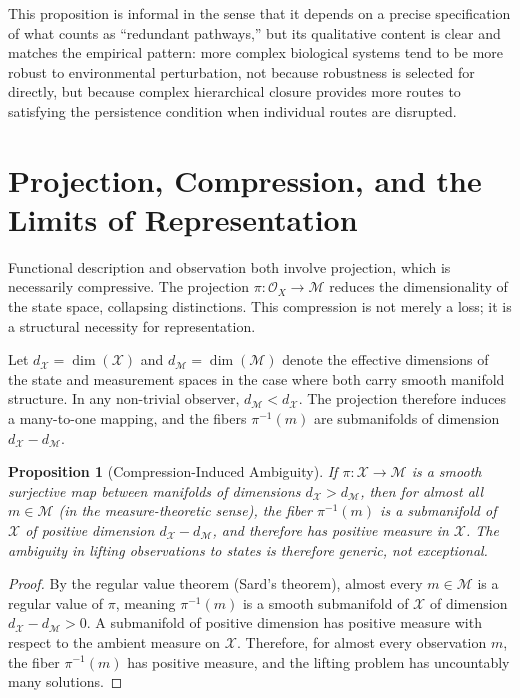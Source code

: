 \documentclass[12pt, a4paper, oneside]{article}
\theoremstyle{plain}
\newtheorem{proposition}[theorem]{Proposition}
\theoremstyle{definition}
\theoremstyle{remark}
\newcommand{\X}{\mathcal{X}}
\newcommand{\M}{\mathcal{M}}
\newcommand{\Obs}{\mathcal{O}}
\newcommand{\proj}{\pi}
\begin{document}
This proposition is informal in the sense that it depends on a precise specification of what counts as ``redundant pathways,'' but its qualitative content is clear and matches the empirical pattern: more complex biological systems tend to be more robust to environmental perturbation, not because robustness is selected for directly, but because complex hierarchical closure provides more routes to satisfying the persistence condition when individual routes are disrupted.

\section{Projection, Compression, and the Limits of Representation}

Functional description and observation both involve projection, which is necessarily compressive. The projection $\proj : \Obs_X \to \M$ reduces the dimensionality of the state space, collapsing distinctions. This compression is not merely a loss; it is a structural necessity for representation.

Let $d_\X = \dim(\X)$ and $d_\M = \dim(\M)$ denote the effective dimensions of the state and measurement spaces in the case where both carry smooth manifold structure. In any non-trivial observer, $d_\M < d_\X$. The projection therefore induces a many-to-one mapping, and the fibers $\proj^{-1}(m)$ are submanifolds of dimension $d_\X - d_\M$.

\begin{proposition}[Compression-Induced Ambiguity]
\label{prop:compression}
If $\proj : \X \to \M$ is a smooth surjective map between manifolds of dimensions $d_\X > d_\M$, then for almost all $m \in \M$ (in the measure-theoretic sense), the fiber $\proj^{-1}(m)$ is a submanifold of $\X$ of positive dimension $d_\X - d_\M$, and therefore has positive measure in $\X$. The ambiguity in lifting observations to states is therefore generic, not exceptional.
\end{proposition}

\begin{proof}
By the regular value theorem (Sard's theorem), almost every $m \in \M$ is a regular value of $\proj$, meaning $\proj^{-1}(m)$ is a smooth submanifold of $\X$ of dimension $d_\X - d_\M > 0$. A submanifold of positive dimension has positive measure with respect to the ambient measure on $\X$. Therefore, for almost every observation $m$, the fiber $\proj^{-1}(m)$ has positive measure, and the lifting problem has uncountably many solutions.
\end{proof}
\end{document}
